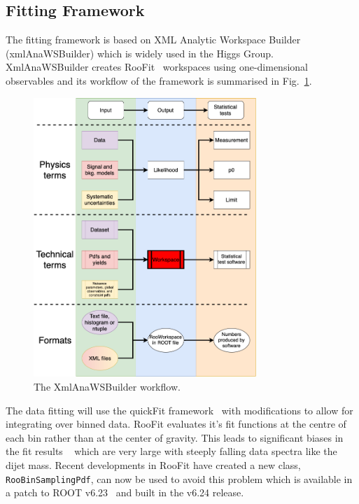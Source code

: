 
\subsection{Fitting Framework}

The fitting framework is based on XML Analytic Workspace Builder~\cite{xmlAnaWSBuilder} (xmlAnaWSBuilder) 
which is widely used in the Higgs Group. XmlAnaWSBuilder creates RooFit~\cite{RooFit} workspaces using one-dimensional 
observables and its workflow of the framework is summarised in Fig.~\ref{fig:xmlAnaWSBuilderworkflow}.

\begin{figure}[htb]
 \centering
\includegraphics[width=0.75\textwidth]{figures/06-StatisticalFramework/xmlAnaWSBuilder_workflow}
\caption{The XmlAnaWSBuilder workflow.  \label{fig:xmlAnaWSBuilderworkflow}}
\end{figure}

The data fitting will use the quickFit framework~\cite{quickFit} with modifications to allow for integrating over binned data.
RooFit evaluates it's fit functions at the centre of each bin rather than at the center of gravity. This leads to significant 
biases in the fit results ~\cite{gligorov2021avoiding} which are very large with steeply falling data spectra like the dijet mass. 
Recent developments in RooFit have created a new class, \texttt{RooBinSamplingPdf}, can now be used to avoid this problem 
which is available in a patch to ROOT v6.23~\cite{RooBinSamplingPdf} and built in the v6.24 release. 


